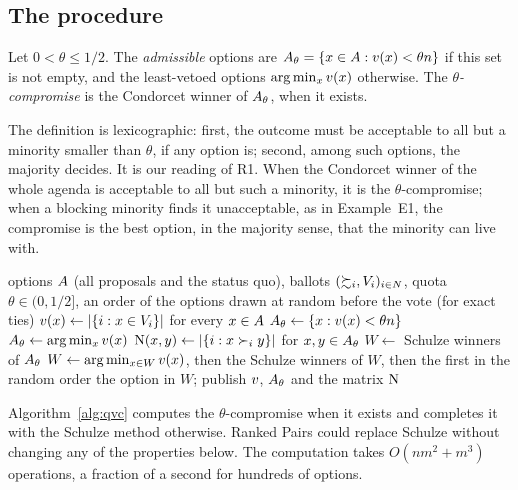 \subsection{The procedure}

\begin{definition}\label{def:compromise}
Let $0 < \theta \le 1/2$. The \emph{admissible} options are
$A_\theta = \{x \in A : v(x) < \theta n\}$ if this set is not empty, and the least-vetoed options
$\arg\min_x v(x)$ otherwise. The \emph{$\theta$-compromise} is the Condorcet winner of $A_\theta$, when it
exists.
\end{definition}

The definition is lexicographic: first, the outcome must be acceptable to all but a minority smaller than
$\theta$, if any option is; second, among such options, the majority decides. It is our reading of R1.
When the Condorcet winner of the whole agenda is acceptable to all but such a minority, it is the
$\theta$-compromise; when a blocking minority finds it unacceptable, as in Example~E1, the compromise is
the best option, in the majority sense, that the minority can live with.

\begin{algorithm}[htbp]
\caption{\QVC($\theta$): Condorcet with a blocking quota}\label{alg:qvc}
\begin{algorithmic}[1]
\Require options $A$ (all proposals and the status quo), ballots $(\succsim_i, V_i)_{i \in N}$,
  quota $\theta \in (0, 1/2]$, an order of the options drawn at random before the vote (for exact ties)
\State $v(x) \gets |\{i : x \in V_i\}|$ for every $x \in A$ 
\State $A_\theta \gets \{x : v(x) < \theta n\}$
\If{$\Adm = \emptyset$} $A_\theta \gets \arg\min_x v(x)$ 
\EndIf
\State $\operatorname{N}(x,y) \gets |\{i : x \succ_i y\}|$ for $x, y \in A_\theta$ 
\State $W \gets$ Schulze winners of $A_\theta$ 
 $W \gets \arg\min_{x \in W} v(x)$, then the Schulze winners of $W$, then the first
  in the random order
\EndIf
\State \Return the option in $W$; publish $v$, $A_\theta$ and the matrix $\operatorname{N}$
\end{algorithmic}
\end{algorithm}

Algorithm~\ref{alg:qvc} computes the $\theta$-compromise when it exists and completes it with the
Schulze method otherwise. Ranked Pairs could replace Schulze without changing any of the properties below.
The computation takes $O(nm^2 + m^3)$ operations, a fraction of a second for hundreds of options.


